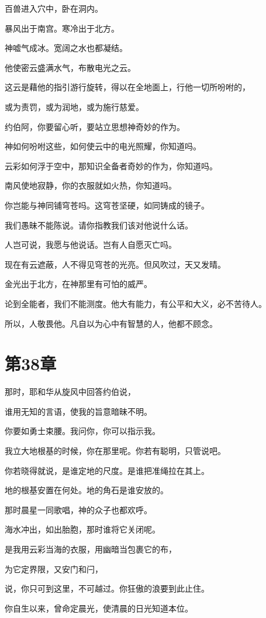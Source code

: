 \documentclass[12pt,oneside]{book}
\begin{document}
百兽进入穴中，卧在洞内。

暴风出于南宫。寒冷出于北方。

神嘘气成冰。宽阔之水也都凝结。

他使密云盛满水气，布散电光之云。

这云是藉他的指引游行旋转，得以在全地面上，行他一切所吩咐的，

或为责罚，或为润地，或为施行慈爱。

约伯阿，你要留心听，要站立思想神奇妙的作为。

神如何吩咐这些，如何使云中的电光照耀，你知道吗。

云彩如何浮于空中，那知识全备者奇妙的作为，你知道吗。

南风使地寂静，你的衣服就如火热，你知道吗。

你岂能与神同铺穹苍吗。这穹苍坚硬，如同铸成的镜子。

我们愚昧不能陈说。请你指教我们该对他说什么话。

人岂可说，我愿与他说话。岂有人自愿灭亡吗。

现在有云遮蔽，人不得见穹苍的光亮。但风吹过，天又发晴。

金光出于北方，在神那里有可怕的威严。

论到全能者，我们不能测度。他大有能力，有公平和大义，必不苦待人。

所以，人敬畏他。凡自以为心中有智慧的人，他都不顾念。


\chapter{第38章}
那时，耶和华从旋风中回答约伯说，

谁用无知的言语，使我的旨意暗昧不明。

你要如勇士束腰。我问你，你可以指示我。

我立大地根基的时候，你在那里呢。你若有聪明，只管说吧。

你若晓得就说，是谁定地的尺度。是谁把准绳拉在其上。

地的根基安置在何处。地的角石是谁安放的。

那时晨星一同歌唱，神的众子也都欢呼。

海水冲出，如出胎胞，那时谁将它关闭呢。

是我用云彩当海的衣服，用幽暗当包裹它的布，

为它定界限，又安门和闩，

说，你只可到这里，不可越过。你狂傲的浪要到此止住。

你自生以来，曾命定晨光，使清晨的日光知道本位。
\end{document}
